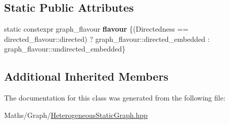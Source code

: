 \subsection*{Static Public Attributes}
\begin{DoxyCompactItemize}
\item 
\mbox{\label{classsequoia_1_1maths_1_1heterogeneous__embedded__static__graph_a33618327ca3cc73b493b693cd0fe3df4}} 
static constexpr graph\+\_\+flavour {\bfseries flavour} \{(Directedness == directed\+\_\+flavour\+::directed) ? graph\+\_\+flavour\+::directed\+\_\+embedded \+: graph\+\_\+flavour\+::undirected\+\_\+embedded\}
\end{DoxyCompactItemize}
\subsection*{Additional Inherited Members}


The documentation for this class was generated from the following file\+:\begin{DoxyCompactItemize}
\item 
Maths/\+Graph/\mbox{\hyperlink{_heterogeneous_static_graph_8hpp}{Heterogeneous\+Static\+Graph.\+hpp}}\end{DoxyCompactItemize}
